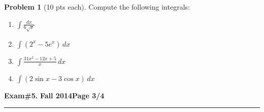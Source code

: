 \documentclass[12pt]{article}
\theoremstyle{definition}
\newtheorem{problem}{Problem}
\begin{document}
\begin{problem}[10 pts each] 
Compute the following integrals:
\begin{enumerate}
\item $\displaystyle{\int \frac{dx}{6\sqrt{x}}}$
\vspace{1cm}
\begin{flushright}
\end{flushright}
\item $\displaystyle{\int (2^x-5e^x)\, dx}$
\vspace{2.5cm}
\begin{flushright}
\end{flushright}
\item $\displaystyle{\int \frac{31 x^2 - 12x + 5}{ x }\, dx}$
\vspace{3cm}
\begin{flushright}
\end{flushright}
\item $\displaystyle{\int (2\sin x - 3\cos x)\, dx}$
\vspace{3cm}
\begin{flushright}
\end{flushright}
\end{enumerate}
\end{problem}
\newpage

\hfill{\large\bf Exam\#5.}\hfill{\large\bf
Fall 2014}\hfill{\large\bf Page 3/4}\hrule

\bigskip
\end{document}
